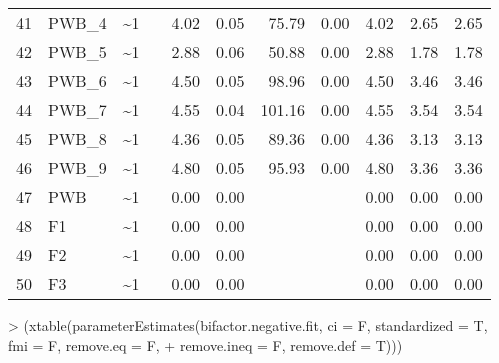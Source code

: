\documentclass{article}
\begin{document}
\begin{table}[ht]
\begin{tabular}{rlllrrrrrrr}
  41 & PWB\_4 & \~{}1 &  & 4.02 & 0.05 & 75.79 & 0.00 & 4.02 & 2.65 & 2.65 \\ 
  42 & PWB\_5 & \~{}1 &  & 2.88 & 0.06 & 50.88 & 0.00 & 2.88 & 1.78 & 1.78 \\ 
  43 & PWB\_6 & \~{}1 &  & 4.50 & 0.05 & 98.96 & 0.00 & 4.50 & 3.46 & 3.46 \\ 
  44 & PWB\_7 & \~{}1 &  & 4.55 & 0.04 & 101.16 & 0.00 & 4.55 & 3.54 & 3.54 \\ 
  45 & PWB\_8 & \~{}1 &  & 4.36 & 0.05 & 89.36 & 0.00 & 4.36 & 3.13 & 3.13 \\ 
  46 & PWB\_9 & \~{}1 &  & 4.80 & 0.05 & 95.93 & 0.00 & 4.80 & 3.36 & 3.36 \\ 
  47 & PWB & \~{}1 &  & 0.00 & 0.00 &  &  & 0.00 & 0.00 & 0.00 \\ 
  48 & F1 & \~{}1 &  & 0.00 & 0.00 &  &  & 0.00 & 0.00 & 0.00 \\ 
  49 & F2 & \~{}1 &  & 0.00 & 0.00 &  &  & 0.00 & 0.00 & 0.00 \\ 
  50 & F3 & \~{}1 &  & 0.00 & 0.00 &  &  & 0.00 & 0.00 & 0.00 \\ 
   \hline
\end{tabular}
\end{table}
> (xtable(parameterEstimates(bifactor.negative.fit, ci = F, standardized = T,  fmi = F, remove.eq = F, 
+                    remove.ineq = F, remove.def = T)))
\end{document}

